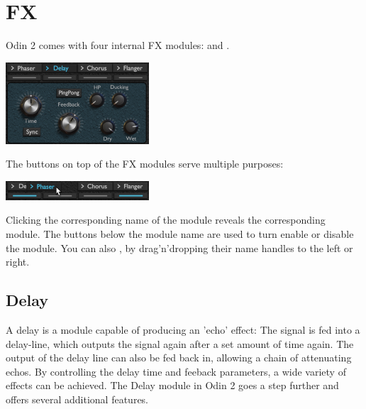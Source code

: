 \chapter{FX}

Odin 2 comes with four internal FX modules:  and .

\begin{center}
    \includegraphics[width=0.4\textwidth]{graphics/FX.png}
\end{center}

The buttons on top of the FX modules serve multiple purposes:

\begin{center}
    \includegraphics[width=0.4\textwidth]{graphics/FX_selector.png}
\end{center}

Clicking the corresponding name of the module reveals the corresponding module. The buttons below the module name are used to turn enable or disable the module.
You can also , by drag'n'dropping their name handles to the left or right.



\section{Delay}
\label{delay}

A delay is a module capable of producing an 'echo' effect: The signal is fed into a delay-line, which outputs the signal again after a set amount of time again. The output of the delay line can also be fed back in, allowing a chain of attenuating echos. By controlling the delay time and feeback parameters, a wide variety of effects can be achieved. The Delay module in Odin 2 goes a step further and offers several additional features.

